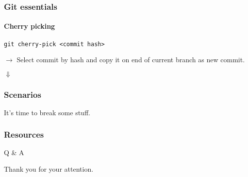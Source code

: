 \documentclass{beamer}
\begin{document}
    \begin{frame}[fragile]
        \frametitle{Git essentials}
        \framesubtitle{Cherry picking}
        \begin{lstlisting}[gobble=12]
            git cherry-pick <commit hash>
        \end{lstlisting}
        $\rightarrow$ Select commit by hash and copy it on end of current branch as new commit.\newline
        \begin{center}$\Downarrow$\end{center}
    \end{frame}

    \begin{frame}
        \frametitle{Scenarios}
        It's time to break some stuff. 
    \end{frame}
    \begin{frame}[fragile]
        \frametitle{Resources}
        \nocite{*}
        \printbibliography     
    \end{frame}
    \begin{frame}
        \Huge{Q \& A}
    \end{frame}
    \begin{frame}
        \Huge{Thank you for your attention.}
    \end{frame}
\end{document}
